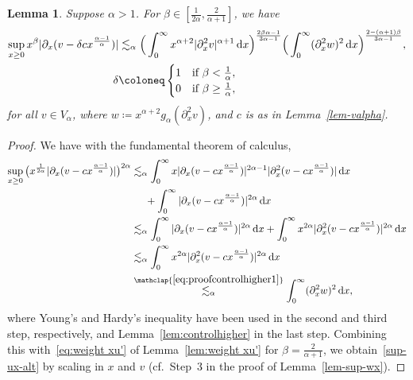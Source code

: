 \documentclass[reqno,12pt]{amsart}
\renewcommand{\d}{\ensuremath{\mathrm{d}}}
\renewcommand{\d}{\ensuremath{{\rm d}}}
\newtheorem{lemma}[theorem]{Lemma}
\numberwithin{equation}{section}
\begin{document}
%
\begin{lemma}\label{lem-sup-ux-alt}
Suppose $\alpha>1$. For $\beta \in [\frac{1}{2\alpha},\frac{2}{\alpha+1}]$, we have
%
\begin{align}\nonumber
\sup_{x \ge 0} x^\beta |\partial_x (v - \delta c x^{\frac{\alpha-1}{\alpha}})| &\lesssim_\alpha \Big(\int_0^\infty x^{\alpha+2} |\partial_x^2 v|^{\alpha+1} \, \d x\Big)^{\frac{2\beta\alpha-1}{3\alpha-1}} \Big(\int_0^\infty (\partial_x^2 w)^2 \, \d x\Big)^{\frac{2 - (\alpha+1)\beta}{3\alpha-1}},  \\
\delta &\coloneq \begin{cases} 1 & \text{if } \beta < \frac{1}{\alpha}, \\ 0 & \text{if } \beta \ge \frac{1}{\alpha}, \end{cases} \label{sup-ux-alt} 
\end{align}
%
for all $v \in V_\alpha$, where $w \coloneq x^{\alpha+2} g_\alpha(\partial_x^2 v)$, and $c$ is as in Lemma~\ref{lem-valpha}.
\end{lemma}
%


%
\begin{proof}
We have with the fundamental theorem of calculus, 
%
\begin{align*}
\sup_{x \ge 0} \big(x^{\frac{1}{2\alpha}} |\partial_x(v - c x^{\frac{\alpha-1}{\alpha}})|\big)^{2\alpha} &\lesssim_\alpha \int_0^\infty x |\partial_x(v - c x^{\frac{\alpha-1}{\alpha}})|^{2\alpha-1} |\partial_x^2(v - c x^{\frac{\alpha-1}{\alpha}})| \, \d x \\
&\phantom{\lesssim_\alpha} + \int_0^\infty |\partial_x(v - c x^{\frac{\alpha-1}{\alpha}})|^{2\alpha} \, \d x \\
&\lesssim_\alpha \int_0^\infty |\partial_x(v - c x^{\frac{\alpha-1}{\alpha}})|^{2\alpha} \, \d x + \int_0^\infty x^{2\alpha} |\partial_x^2(v - c x^{\frac{\alpha-1}{\alpha}})|^{2\alpha} \, \d x \\
&\lesssim_\alpha \int_0^\infty x^{2\alpha} |\partial_x^2(v - c x^{\frac{\alpha-1}{\alpha}})|^{2\alpha} \, \d x \\
&\stackrel{\mathclap{\eqref{eq:proofcontrolhigher1}}}{\lesssim_\alpha} \int_0^\infty (\partial_x^2 w)^2 \, \d x,
\end{align*}
%
where Young's and Hardy's inequality have been used in the second and third step, respectively, and Lemma~\ref{lem:controlhigher} in the last step. Combining this with~\eqref{eq:weight xu'} of Lemma~\ref{lem:weight xu'} for 
$\beta = \tfrac{2}{\alpha+1}$, we obtain~\eqref{sup-ux-alt} by scaling in $x$ and $v$ (cf.~Step~3 in the proof of Lemma~\ref{lem-sup-wx}).
\end{proof}
%
\end{document}
